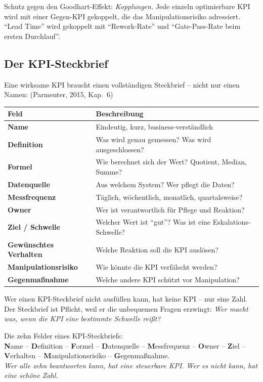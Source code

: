 \documentclass[11pt,a4paper,oneside]{article}
\newcommand{\caveatfontfallback}{\itshape}
\newcommand\caveatfont{\caveatfontfallback}%
\newcommand{\akzent}[1]{{\caveatfont\color{lpAmber}#1}}
\newcommand{\quelle}[1]{{\footnotesize\color{lpGray}(#1)}}
\begin{document}
Schutz gegen den Goodhart-Effekt: \emph{Kopplungen.} Jede einzeln optimierbare KPI wird mit einer Gegen-KPI gekoppelt, die das Manipulationsrisiko adressiert. ``Lead Time'' wird gekoppelt mit ``Rework-Rate'' und ``Gate-Pass-Rate beim ersten Durchlauf''.

\subsection{Der KPI-Steckbrief}

Eine wirksame KPI braucht einen vollständigen Steckbrief -- nicht nur einen Namen: \quelle{Parmenter, 2015, Kap.~6}

\begin{tabularx}{\linewidth}{@{}>{\bfseries}lX@{}}
\toprule
Feld & Beschreibung \\
\midrule
Name              & Eindeutig, kurz, business-verständlich \\
Definition        & Was wird genau gemessen? Was wird ausgeschlossen? \\
Formel            & Wie berechnet sich der Wert? Quotient, Median, Summe? \\
Datenquelle       & Aus welchem System? Wer pflegt die Daten? \\
Messfrequenz      & Täglich, wöchentlich, monatlich, quartalsweise? \\
Owner             & Wer ist verantwortlich für Pflege und Reaktion? \\
Ziel / Schwelle   & Welcher Wert ist ``gut''? Was ist eine Eskalations-Schwelle? \\
Gewünschtes Verhalten & Welche Reaktion soll die KPI auslösen? \\
Manipulations\-risiko & Wie könnte die KPI verfälscht werden? \\
Gegenmaßnahme     & Welche andere KPI schützt vor Manipulation? \\
\bottomrule
\end{tabularx}

\medskip

\noindent Wer einen KPI-Steckbrief nicht ausfüllen kann, hat keine KPI -- nur eine Zahl. Der Steckbrief ist Pflicht, weil er die unbequemen Fragen erzwingt: \emph{Wer macht was, wenn die KPI eine bestimmte Schwelle reißt?}

\begin{eselsbox}[Eselsbrücke: \akzent{N-D-F-D-M-O-Z-V-M-G}]
Die zehn Felder eines KPI-Steckbriefs:\\[2pt]
\textbf{N}ame -- \textbf{D}efinition -- \textbf{F}ormel -- \textbf{D}atenquelle -- \textbf{M}essfrequenz -- \textbf{O}wner -- \textbf{Z}iel -- \textbf{V}erhalten -- \textbf{M}anipulationsrisiko -- \textbf{G}egenmaßnahme.\\[2pt]
\emph{Wer alle zehn beantworten kann, hat eine steuerbare KPI. Wer es nicht kann, hat eine schöne Zahl.}
\end{eselsbox}
\end{document}
